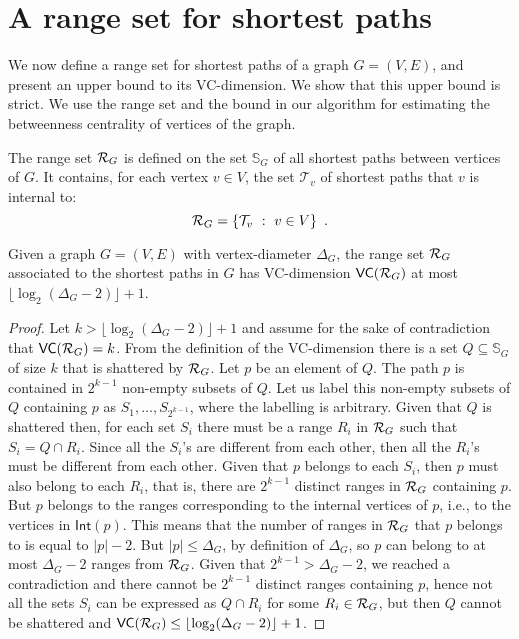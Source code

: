 \section{A range set for shortest paths}\label{sec:rangeset}
We now define a range set for shortest paths of a graph $G=(V,E)$, and present 
an upper bound to its VC-dimension. We show that this upper bound is strict. We
use the range set and the bound in our algorithm for estimating the betweenness
centrality of vertices of the graph.

The range set $\mathcal{R}_G$ is defined on the set $\mathbb{S}_G$ of all shortest
paths between vertices of $G$. It contains, for each vertex $v\in V$, the set
$\mathcal{T}_v$ of shortest paths that $v$ is internal to:
\[
\mathcal{R}_G = \{\mathcal{T}_v ~:~ v\in V\}\enspace.
\]

\begin{lemma}\label{lem:vcdimuppbound}
  Given a graph $G=(V,E)$ with vertex-diameter $\Delta_G$, the range set
  $\mathcal{R}_G$ associated to the shortest paths in $G$ has VC-dimension
  $\mathsf{VC}(\mathcal{R}_G)$ at most $\lfloor\log_2(\Delta_G-2)\rfloor+1$.
\end{lemma}

\begin{proof}
Let $k>\lfloor\log_2(\Delta_G-2)\rfloor+1$ and assume for the sake of contradiction
that $\mathsf{VC}(\mathcal{R}_G)=k$. From the definition of the VC-dimension there is a set
$Q\subseteq\mathbb{S}_G$ of size $k$ that is shattered by $\mathcal{R}_G$. Let $p$ be
an element of $Q$. The path $p$ is contained in $2^{k-1}$ non-empty subsets of
$Q$. Let us label this non-empty subsets of $Q$ containing $p$ as
$S_1,\dotsc,S_{2^{k-1}}$, where the labelling is arbitrary.
Given that $Q$ is shattered then, for each set $S_i$ there must be a range $R_i$ in
$\mathcal{R}_G$ such that $S_i=Q\cap R_i$. Since all the $S_i$'s are
different from each other, then all the $R_i$'s must be different from each
other. Given that $p$ belongs to each $S_i$, then $p$ must also belong to each
$R_i$, that is, there are $2^{k-1}$ distinct ranges in $\mathcal{R}_G$ containing
$p$. But $p$ belongs to the ranges corresponding to the internal vertices of
$p$, i.e., to the vertices in $\mathsf{Int}(p)$. This means that the number of ranges
in $\mathcal{R}_G$ that $p$ belongs to is equal to $|p|-2$. But $|p|\le\Delta_G$, by definition of $\Delta_G$, so $p$
can belong to at most $\Delta_G-2$ ranges from $\mathcal{R}_G$. Given that
$2^{k-1}>\Delta_G-2$, we reached a contradiction and there cannot be $2^{k-1}$
distinct ranges containing $p$, hence not all the sets $S_i$ can be expressed as
$Q\cap R_i$ for some $R_i\in\mathcal{R}_G$, but then $Q$ cannot be shattered and
$\mathsf{VC}(\mathcal{R}_G)\le\lfloor\log_2(\Delta_G-2)\rfloor+1$.%
\end{proof}

